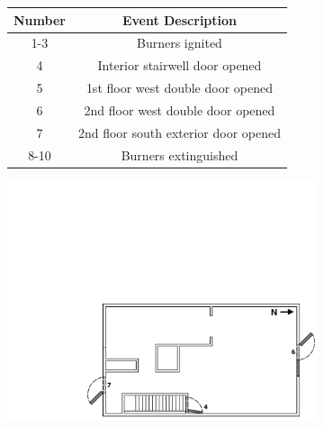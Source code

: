 \documentclass[12pt,oneside]{book}
\begin{document}
\begin{figure}[!ht]
\begin{minipage}[b]{0.8\columnwidth}
\begin{flushleft}
\begin{figure}[!ht]
\begin{minipage}[b]{0.8\columnwidth}
	\begin{flushleft}
	\small
	\begin{tabular}[b]{cc}
 	\toprule
 	\textbf{Number} & \textbf{Event Description} \\
 	\midrule
 	1-3  & Burners ignited \\
 	4	 & Interior stairwell door opened \\
 	5 	 & 1st floor west double door opened \\
 	6	 & 2nd floor west double door opened \\
 	7 	 & 2nd floor south exterior door opened \\
 	8-10 & Burners extinguished \\
	\bottomrule
	\end{tabular}
	\end{flushleft}
\end{minipage}
\begin{minipage}[b]{0.9\columnwidth}
	\vspace{15pt}
	\centering
	\includegraphics[width=\columnwidth]{../Figures/Floor_Plans/West_Structure_2nd_Floor_Test_24}

\end{minipage}
\end{figure}
\end{flushleft}
\end{minipage}
\end{figure}
\end{document}
